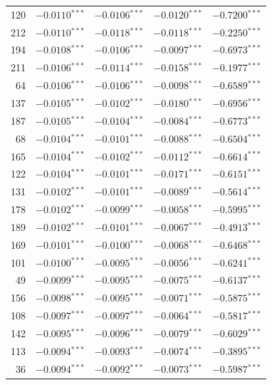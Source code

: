 \documentclass[review,authoryear]{elsarticle}
\begin{document}
\begin{longtable}{rrrrr}
120 & $-0.0110$$^{***}$ & $-0.0106$$^{***}$ & $-0.0120$$^{***}$ & $-0.7200$$^{***}$ \\
212 & $-0.0110$$^{***}$ & $-0.0118$$^{***}$ & $-0.0118$$^{***}$ & $-0.2250$$^{***}$ \\
194 & $-0.0108$$^{***}$ & $-0.0106$$^{***}$ & $-0.0097$$^{***}$ & $-0.6973$$^{***}$ \\
211 & $-0.0106$$^{***}$ & $-0.0114$$^{***}$ & $-0.0158$$^{***}$ & $-0.1977$$^{***}$ \\
64 & $-0.0106$$^{***}$ & $-0.0106$$^{***}$ & $-0.0098$$^{***}$ & $-0.6589$$^{***}$ \\
137 & $-0.0105$$^{***}$ & $-0.0102$$^{***}$ & $-0.0180$$^{***}$ & $-0.6956$$^{***}$ \\
187 & $-0.0105$$^{***}$ & $-0.0104$$^{***}$ & $-0.0084$$^{***}$ & $-0.6773$$^{***}$ \\
68 & $-0.0104$$^{***}$ & $-0.0101$$^{***}$ & $-0.0088$$^{***}$ & $-0.6504$$^{***}$ \\
165 & $-0.0104$$^{***}$ & $-0.0102$$^{***}$ & $-0.0112$$^{***}$ & $-0.6614$$^{***}$ \\
122 & $-0.0104$$^{***}$ & $-0.0101$$^{***}$ & $-0.0171$$^{***}$ & $-0.6151$$^{***}$ \\
131 & $-0.0102$$^{***}$ & $-0.0101$$^{***}$ & $-0.0089$$^{***}$ & $-0.5614$$^{***}$ \\
178 & $-0.0102$$^{***}$ & $-0.0099$$^{***}$ & $-0.0058$$^{***}$ & $-0.5995$$^{***}$ \\
189 & $-0.0102$$^{***}$ & $-0.0101$$^{***}$ & $-0.0067$$^{***}$ & $-0.4913$$^{***}$ \\
169 & $-0.0101$$^{***}$ & $-0.0100$$^{***}$ & $-0.0068$$^{***}$ & $-0.6468$$^{***}$ \\
101 & $-0.0100$$^{***}$ & $-0.0095$$^{***}$ & $-0.0056$$^{***}$ & $-0.6241$$^{***}$ \\
49 & $-0.0099$$^{***}$ & $-0.0095$$^{***}$ & $-0.0075$$^{***}$ & $-0.6137$$^{***}$ \\
156 & $-0.0098$$^{***}$ & $-0.0095$$^{***}$ & $-0.0071$$^{***}$ & $-0.5875$$^{***}$ \\
108 & $-0.0097$$^{***}$ & $-0.0097$$^{***}$ & $-0.0064$$^{***}$ & $-0.5817$$^{***}$ \\
142 & $-0.0095$$^{***}$ & $-0.0096$$^{***}$ & $-0.0079$$^{***}$ & $-0.6029$$^{***}$ \\
113 & $-0.0094$$^{***}$ & $-0.0093$$^{***}$ & $-0.0074$$^{***}$ & $-0.3895$$^{***}$ \\
36 & $-0.0094$$^{***}$ & $-0.0092$$^{***}$ & $-0.0073$$^{***}$ & $-0.5987$$^{***}$ \\

\end{longtable}
\end{document}
